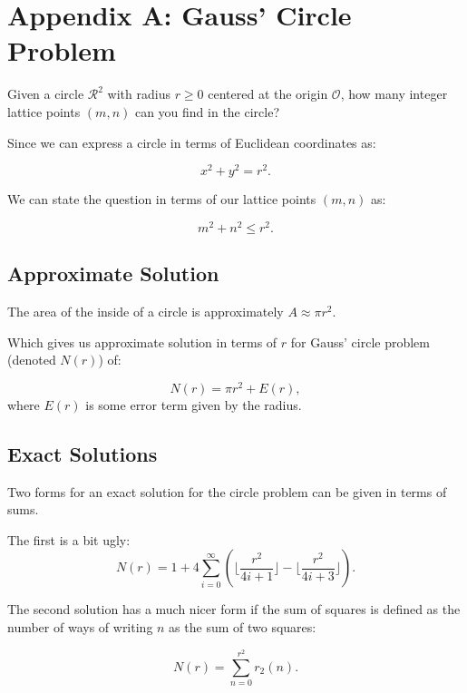 \section*{Appendix A: Gauss' Circle Problem}

Given a circle $\mathcal{R}^{2}$ with radius $r \geq 0$ centered at the origin $\mathcal{O}$, how many integer lattice points $(m,n)$ can you find in the circle?

Since we can express a circle in terms of Euclidean coordinates as:

\[x^{2} + y^{2} = r^{2}.\]

We can state the question in terms of our lattice points $(m,n)$ as:

\[m^{2} + n^{2} \leq r^{2}.\]

\subsection*{Approximate Solution}

The area of the inside of a circle is approximately $A \approx \pi r^{2}$.

Which gives us approximate solution in terms of $r$ for Gauss' circle problem (denoted $N(r)$) of:

\[N(r) = \pi r^{2} + E(r),\]
where $E(r)$ is some error term given by the radius.


\subsection*{Exact Solutions}

Two forms for an exact solution for the circle problem can be given in terms of sums. 

The first is a bit ugly:
\[N(r) = 1 + 4 \sum_{i=0}^{\infty} \left( \lfloor \frac{r^{2}}{4i+1} \rfloor - \lfloor \frac{r^{2}}{4i+3} \rfloor \right).\]

The second solution has a much nicer form if the sum of squares is defined as the number of ways of writing $n$ as the sum of two squares:

\[N(r) = \sum_{n=0}^{r^{2}} r_{2}(n).\]